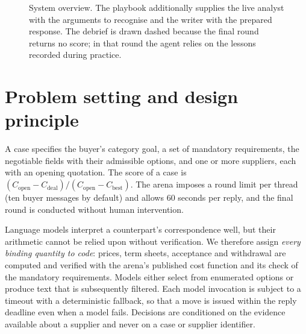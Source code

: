 \documentclass[10pt,a4paper,twocolumn]{article}
\begin{document}
\begin{figure}[b]
\caption{System overview. The playbook additionally supplies the live analyst with the arguments
to recognise and the writer with the prepared response. The debrief is drawn dashed because the
final round returns no score; in that round the agent relies on the lessons recorded during
practice.}
\label{fig:system}
\end{figure}

\section{Problem setting and design principle}

A case specifies the buyer's category goal, a set of mandatory requirements, the negotiable
fields with their admissible options, and one or more suppliers, each with an opening quotation.
The score of a case is $(C_\mathrm{open}-C_\mathrm{deal})/(C_\mathrm{open}-C_\mathrm{best})$.
The arena imposes a round limit per thread (ten buyer messages by default) and allows 60 seconds per reply, and the final round is
conducted without human intervention.

Language models interpret a counterpart's correspondence well, but their arithmetic cannot be
relied upon without verification. We therefore assign \emph{every binding quantity to code}:
prices, term sheets, acceptance and withdrawal are computed and verified with the arena's
published cost function and its check of the mandatory requirements. Models either select from
enumerated options or produce text that is subsequently filtered. Each model invocation is
subject to a timeout with a deterministic fallback, so that a move is issued within the reply deadline even when a model fails. Decisions are conditioned on the evidence available about a supplier and never on a
case or supplier identifier.
\end{document}
